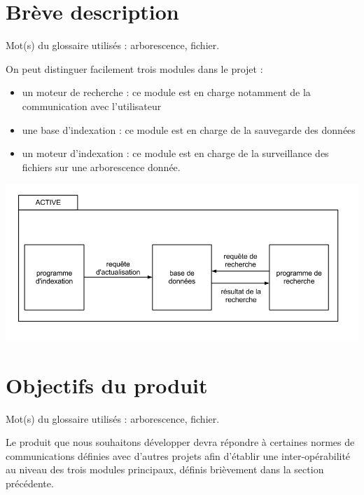 \section{Brève description}
Mot(s) du glossaire utilisés : \gls{arborescence}, \gls{fichier}.

On peut distinguer facilement trois modules dans le projet :
\begin{itemize}
\item un moteur de recherche : ce module est en charge notamment de la communication avec l'utilisateur
\item une base d'indexation : ce module est en charge de la sauvegarde des données
\item un moteur d'indexation : ce module est en charge de la surveillance des fichiers sur une arborescence donnée.
\end{itemize}

\begin{center}
\includegraphics[scale=0.45]{"images/fonctionnement_global_d'active"}
\label{fonctionnement-global}
\end{center}

\section{Objectifs du produit}
Mot(s) du glossaire utilisés : \gls{arborescence}, \gls{fichier}.

Le produit que nous souhaitons développer devra répondre à certaines normes de communications définies avec d'autres projets afin d'établir une inter-opérabilité au niveau des trois modules principaux, définis brièvement dans la section précédente.

